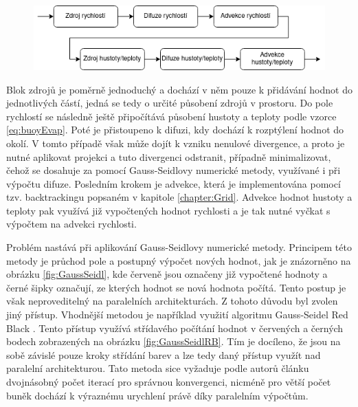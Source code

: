 \begin{figure}[hbt]
	\centering
	\captionsetup{justification=centering}
	\includegraphics[scale=0.6]{obrazky-figures/GridFluid.png}
	\label{fig:Gridflow}
\end{figure}

Blok zdrojů je poměrně jednoduchý a dochází v něm pouze k přidávání hodnot do jednotlivých částí, jedná se tedy o určité působení zdrojů v prostoru. Do pole rychlostí se následně ještě připočítává působení hustoty a teploty podle vzorce \ref{eq:buoyEvap}. Poté je přistoupeno k difuzi, kdy dochází k rozptýlení hodnot do okolí. V tomto případě však může dojít k vzniku nenulové divergence, a proto je nutné aplikovat projekci a tuto divergenci odstranit, případně minimalizovat, čehož se dosahuje za pomocí Gauss-Seidlovy numerické metody, využívané i při výpočtu difuze. Posledním krokem je advekce, která je implementována pomocí tzv. backtrackingu popsaném v kapitole \ref{chapter:Grid}. Advekce hodnot hustoty a teploty pak využívá již vypočtených hodnot rychlosti a je tak nutné vyčkat s výpočtem na advekci rychlosti.

Problém nastává při aplikování Gauss-Seidlovy numerické metody. Principem této metody je průchod pole a postupný výpočet nových hodnot, jak je znázorněno na obrázku \ref{fig:GaussSeidl}, kde červeně jsou označeny již vypočtené hodnoty a černé šipky označují, ze kterých hodnot se nová hodnota počítá. Tento postup je však neproveditelný na paralelních architekturách. Z tohoto důvodu byl zvolen jiný přístup. Vhodnější metodou je například využití algoritmu Gauss-Seidel Red Black \cite{Amador2012LinearSF}. Tento přístup využívá střídavého počítání hodnot v červených a černých bodech zobrazených na obrázku \ref{fig:GaussSeidlRB}. Tím je docíleno, že jsou na sobě závislé pouze kroky střídání barev a lze tedy daný přístup využít nad paralelní architekturou. Tato metoda sice vyžaduje podle autorů článku \cite{Amador2012LinearSF} dvojnásobný počet iterací pro správnou konvergenci, nicméně pro větší počet buněk dochází k výraznému urychlení právě díky paralelním výpočtům.

